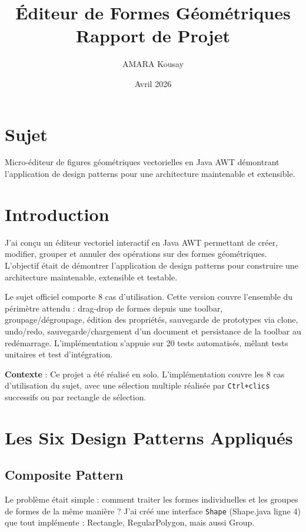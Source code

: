 \documentclass[11pt,a4paper,french]{article}
\title{\textbf{Éditeur de Formes Géométriques}\\
  \large{Rapport de Projet}}
\author{AMARA Kousay}
\date{Avril 2026}
\begin{document}
\maketitle

\section*{Sujet}
Micro-éditeur de figures géométriques vectorielles en Java AWT démontrant l'application de design patterns pour une architecture maintenable et extensible.

\vspace{1cm}

\section{Introduction}

J'ai conçu un éditeur vectoriel interactif en Java AWT permettant de créer, modifier, grouper et annuler des opérations sur des formes géométriques. L'objectif était de démontrer l'application de design patterns pour construire une architecture maintenable, extensible et testable.

Le sujet officiel comporte 8 cas d'utilisation. Cette version couvre l'ensemble du périmètre attendu : drag-drop de formes depuis une toolbar, groupage/dégroupage, édition des propriétés, sauvegarde de prototypes via clone, undo/redo, sauvegarde/chargement d'un document et persistance de la toolbar au redémarrage. L'implémentation s'appuie sur 20 tests automatisés, mêlant tests unitaires et test d'intégration.

\textbf{Contexte} : Ce projet a été réalisé en solo. L'implémentation couvre les 8 cas d'utilisation du sujet, avec une sélection multiple réalisée par \texttt{Ctrl+clics} successifs ou par rectangle de sélection.

\section{Les Six Design Patterns Appliqués}

\subsection{Composite Pattern}

Le problème était simple : comment traiter les formes individuelles et les groupes de formes de la même manière ? J'ai créé une interface \texttt{Shape} (Shape.java ligne 4) que tout implémente : Rectangle, RegularPolygon, mais aussi Group.
\end{document}
